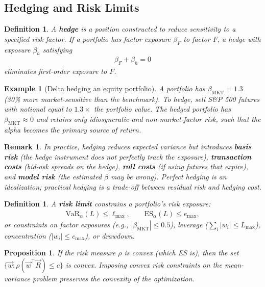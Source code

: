 \documentclass{report}
\theoremstyle{spacedplain}
\newtheorem{proposition}[theorem]{Proposition}
\theoremstyle{spaceddefinition}
\newtheorem{definition}[theorem]{Definition}
\newtheorem{example}[theorem]{Example}
\theoremstyle{spacedremark}
\newtheorem{remark}[theorem]{Remark}
\begin{document}
\subsection{Hedging and Risk Limits}

\begin{definition}
A \textbf{hedge} is a position constructed to reduce sensitivity to a specified risk factor. If a portfolio has factor exposure $\beta_F$ to factor $F$, a hedge with exposure $\beta_h$ satisfying
\begin{align}
    \beta_F + \beta_h = 0
\end{align}
eliminates first-order exposure to $F$.
\end{definition}

\begin{example}[Delta hedging an equity portfolio]
A portfolio has $\beta_{\text{MKT}} = 1.3$ (30\% more market-sensitive than the benchmark). To hedge, sell S\&P 500 futures with notional equal to $1.3 \times$ the portfolio value. The hedged portfolio has $\beta_{\text{MKT}} \approx 0$ and retains only idiosyncratic and non-market-factor risk, such that the alpha becomes the primary source of return.
\end{example}

\begin{remark}
In practice, hedging reduces expected variance but introduces \textbf{basis risk} (the hedge instrument does not perfectly track the exposure), \textbf{transaction costs} (bid-ask spreads on the hedge), \textbf{roll costs} (if using futures that expire), and \textbf{model risk} (the estimated $\beta$ may be wrong). Perfect hedging is an idealization; practical hedging is a trade-off between residual risk and hedging cost.
\end{remark}

\begin{definition}
A \textbf{risk limit} constrains a portfolio's risk exposure:
\begin{align}
    \text{VaR}_\alpha(L) \leq \ell_{\max}, \qquad \text{ES}_\alpha(L) \leq e_{\max},
\end{align}
or constraints on factor exposures (e.g., $|\beta_{\text{MKT}}| \leq 0.5$), leverage ($\sum_i|w_i| \leq L_{\max}$), concentration ($|w_i| \leq c_{\max}$), or drawdown.
\end{definition}

\begin{proposition}
If the risk measure $\rho$ is convex (which ES is), then the set $\{\vec{w} : \rho(\vec{w}^\top\vec{R}) \leq c\}$ is convex. Imposing convex risk constraints on the mean-variance problem preserves the convexity of the optimization.
\end{proposition}
\end{document}
